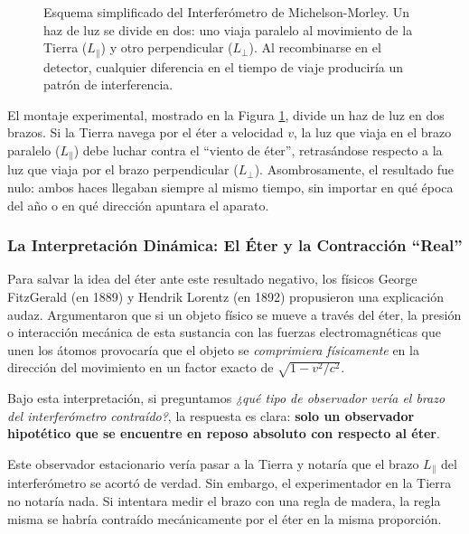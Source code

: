 \documentclass[11pt,a4paper]{book}
\begin{document}
\begin{figure}[h]
    \caption{Esquema simplificado del Interferómetro de Michelson-Morley. Un haz de luz se divide en dos: uno viaja paralelo al movimiento de la Tierra ($L_\parallel$) y otro perpendicular ($L_\perp$). Al recombinarse en el detector, cualquier diferencia en el tiempo de viaje produciría un patrón de interferencia.}
    \label{fig:michelson_morley}
\end{figure}

El montaje experimental, mostrado en la Figura \ref{fig:michelson_morley}, divide un haz de luz en dos brazos. Si la Tierra navega por el éter a velocidad $v$, la luz que viaja en el brazo paralelo ($L_\parallel$) debe luchar contra el ``viento de éter'', retrasándose respecto a la luz que viaja por el brazo perpendicular ($L_\perp$). Asombrosamente, el resultado fue nulo: ambos haces llegaban siempre al mismo tiempo, sin importar en qué época del año o en qué dirección apuntara el aparato.

\subsubsection*{La Interpretación Dinámica: El Éter y la Contracción ``Real''}

Para salvar la idea del éter ante este resultado negativo, los físicos George FitzGerald (en 1889) y Hendrik Lorentz (en 1892) propusieron una explicación audaz. Argumentaron que si un objeto físico se mueve a través del éter, la presión o interacción mecánica de esta sustancia con las fuerzas electromagnéticas que unen los átomos provocaría que el objeto se \textit{comprimiera físicamente} en la dirección del movimiento en un factor exacto de $\sqrt{1 - v^2/c^2}$.

Bajo esta interpretación, si preguntamos \textit{¿qué tipo de observador vería el brazo del interferómetro contraído?}, la respuesta es clara: \textbf{solo un observador hipotético que se encuentre en reposo absoluto con respecto al éter}. 

Este observador estacionario vería pasar a la Tierra y notaría que el brazo $L_\parallel$ del interferómetro se acortó de verdad. Sin embargo, el experimentador en la Tierra no notaría nada. Si intentara medir el brazo con una regla de madera, la regla misma se habría contraído mecánicamente por el éter en la misma proporción. 
\end{document}
